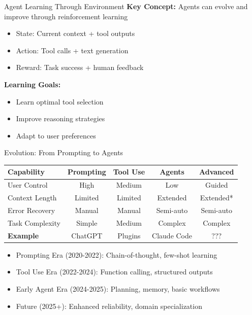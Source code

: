 \documentclass[aspectratio=169]{beamer}
\begin{document}
\begin{frame}{Agent Learning Through Environment}
	\textbf{Key Concept:} Agents can evolve and improve through reinforcement learning
	
	\vspace{0.5cm}
	
	\begin{itemize}
		\item {\color{highlight}State}: Current context + tool outputs
		\item {\color{highlight}Action}: Tool calls + text generation
		\item {\color{highlight}Reward}: Task success + human feedback
	\end{itemize}
	
	\vspace{0.5cm}
	
	\textbf{Learning Goals:}
	\begin{itemize}
		\item Learn optimal tool selection
		\item Improve reasoning strategies  
		\item Adapt to user preferences
	\end{itemize}
\end{frame}

\begin{frame}{Evolution: From Prompting to Agents}
	\begin{center}
		\begin{tabular}{|l|c|c|c|c|}
			\hline
			\textbf{Capability} & \textbf{Prompting} & \textbf{Tool Use} & \textbf{Agents} & \textbf{Advanced} \\
			\hline
			User Control & High & Medium & Low & Guided \\
			Context Length & Limited & Limited & Extended & Extended* \\
			Error Recovery & Manual & Manual & Semi-auto & Semi-auto \\
			Task Complexity & Simple & Medium & Complex & Complex \\
			\hline
			\textbf{Example} & ChatGPT & Plugins & Claude Code & ??? \\
			\hline
		\end{tabular}
	\end{center}
	
	\vspace{0.5cm}
	
	\begin{itemize}
		\item {\color{highlight}Prompting Era} (2020-2022): Chain-of-thought, few-shot learning
		\item {\color{highlight}Tool Use Era} (2022-2024): Function calling, structured outputs
		\item {\color{highlight}Early Agent Era} (2024-2025): Planning, memory, basic workflows
		\item {\color{highlight}Future} (2025+): Enhanced reliability, domain specialization
	\end{itemize}
	
\end{frame}
\end{document}
